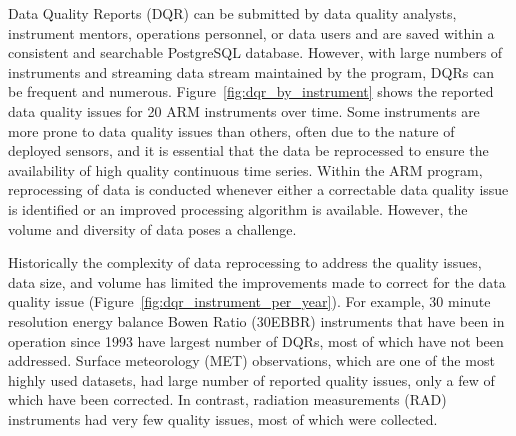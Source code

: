 Data Quality Reports (DQR) can be submitted by data quality analysts,
instrument mentors, operations personnel, or data users and
are saved within a consistent and searchable PostgreSQL database.
However, with large numbers of instruments and streaming data stream
maintained by the program, DQRs can be frequent and numerous. 
Figure~\ref{fig:dqr_by_instrument} shows the reported data quality
issues for 20 ARM instruments over time. Some instruments are more prone
to data quality issues than others, often due to the nature of deployed
sensors, and it is essential that the data be reprocessed to ensure the
availability of high quality continuous time series. Within the ARM program,
reprocessing of data is conducted whenever either a correctable data
quality issue is identified or an
improved processing algorithm is available. However, the volume and
diversity of data poses a challenge.

Historically the complexity of data reprocessing to address the quality
issues, data size, and volume has limited the improvements made to
correct for the data quality issue
(Figure~\ref{fig:dqr_instrument_per_year}). For example, 30 minute
resolution energy balance Bowen Ratio (30EBBR)
instruments that have been in operation since 1993 have largest number of
DQRs, most of which have not been addressed. Surface meteorology (MET)
observations, which are one of the most highly used datasets, had large number of
reported quality issues, only a few of which have been corrected. In
contrast, radiation measurements (RAD) instruments had very few quality
issues, most of which were collected. 

